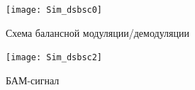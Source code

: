 \documentclass[10pt,a4paper]{article}
\begin{document}
\begin{figure}[h]\centering
	\texttt{[image: Sim\_dsbsc0]}
	\caption{Схема балансной модуляции/демодуляции}\label{fig.Sim_dsbsc0}
\end{figure}                                                                                                                                                                                                                                                                                                                                                                                                                                                                                                                                                                                                                                                                                                                                                                                                                                                                                                                                                                                                                                                                                                                                                                                                                                                                                                                                                                                                                                                                        

\begin{figure}[h]\centering
	\texttt{[image: Sim\_dsbsc2]}
	\caption{БАМ-сигнал}\label{fig.Sim_dsbsc2}
\end{figure}                                                                                                                                                                                                                                                                                                                                                                                                                                                                                                                                                                                                                                                                                                                                                                                                                                                                                                                                                                                                                                                                                                                                                                                                                                                                                                                                                                                                                                                                        
\end{document}
